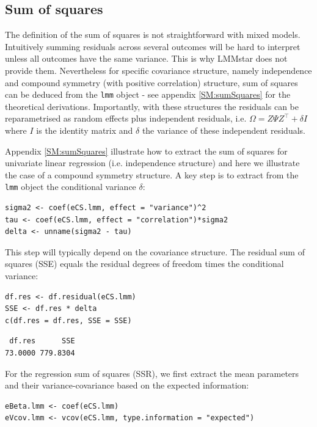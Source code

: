 \documentclass[12pt]{article}
\newcommand\Warning[1][3ex]{%
\renewcommand\stacktype{L}%
\scaleto{\stackon[1.3pt]{\color{red}$\triangle$}{\tiny\bfseries !}}{#1}%
\xspace
}
\newcommand\trans[1]{{#1}^\intercal}%
\begin{document}
\clearpage

\subsection{Sum of squares}
\label{sec:org91254ec}

\Warning The definition of the sum of squares is not straightforward with mixed
models. Intuitively summing residuals across several outcomes will be
hard to interpret unless all outcomes have the same variance. This is
why LMMstar does not provide them. Nevertheless for specific
covariance structure, namely independence and compound symmetry (with
positive correlation) structure, sum of squares can be deduced from
the \texttt{lmm} object - see appendix \ref{SM:sumSquares} for the theoretical
derivations. Importantly, with these structures the residuals can be
reparametrised as random effects plus independent residuals,
i.e. \(\Omega = Z \Psi \trans{Z} + \delta I\) where \(I\) is the
identity matrix and \(\delta\) the variance of these independent
residuals.

\bigskip

Appendix \ref{SM:sumSquares} illustrate how to extract the sum of squares
for univariate linear regression (i.e. independence structure) and
here we illustrate the case of a compound symmetry structure.  A key
step is to extract from the \texttt{lmm} object the conditional variance
\(\delta\):
\lstset{language=r,label= ,caption= ,captionpos=b,numbers=none}
\begin{lstlisting}
sigma2 <- coef(eCS.lmm, effect = "variance")^2
tau <- coef(eCS.lmm, effect = "correlation")*sigma2
delta <- unname(sigma2 - tau)
\end{lstlisting}

This step will typically depend on the covariance structure. The
residual sum of squares (SSE) equals the residual degrees of freedom
times the conditional variance:
\lstset{language=r,label= ,caption= ,captionpos=b,numbers=none}
\begin{lstlisting}
df.res <- df.residual(eCS.lmm)
SSE <- df.res * delta
c(df.res = df.res, SSE = SSE)
\end{lstlisting}

\begin{verbatim}
 df.res      SSE 
73.0000 779.8304
\end{verbatim}


For the regression sum of squares (SSR), we first extract the mean
parameters and their variance-covariance based on the expected
information:
\lstset{language=r,label= ,caption= ,captionpos=b,numbers=none}
\begin{lstlisting}
eBeta.lmm <- coef(eCS.lmm)
eVcov.lmm <- vcov(eCS.lmm, type.information = "expected")
\end{lstlisting}
\end{document}
